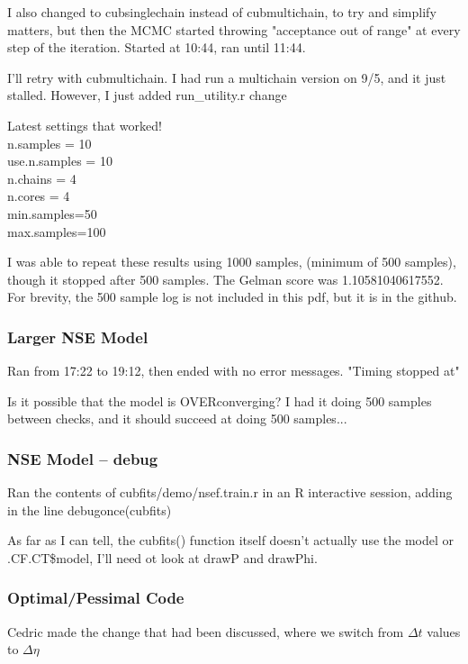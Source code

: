 \documentclass[11pt]{article} %
\begin{document}
I also changed to cubsinglechain instead of cubmultichain, to try and simplify matters, but then the MCMC started throwing "acceptance out of range" at every step of the iteration. Started at 10:44, ran until 11:44. 

I'll retry with cubmultichain. I had run a multichain version on 9/5, and it just stalled. However, I just added run\_utility.r change

Latest settings that worked!
\\n.samples = 10  
\\use.n.samples = 10
\\n.chains = 4
\\n.cores = 4
\\min.samples=50
\\max.samples=100




I was able to repeat these results using 1000 samples, (minimum of 500 samples), though it stopped after 500 samples. The Gelman score was 1.10581040617552. For brevity, the 500 sample log is not included in this pdf, but it is in the github.


\subsubsection{Larger NSE Model}

Ran from 17:22 to 19:12, then ended with no error messages. "Timing stopped at"

Is it possible that the model is OVERconverging? I had it doing 500 samples between checks, and it should succeed at doing 500 samples...


\subsubsection{NSE Model -- debug}

Ran the contents of cubfits/demo/nsef.train.r in an R interactive session, adding in the line debugonce(cubfits)

As far as I can tell, the cubfits() function itself doesn't actually use the model or .CF.CT\$model, I'll need ot look at drawP and drawPhi.


\subsubsection{Optimal/Pessimal Code}

Cedric made the change that had been discussed, where we switch from $\Delta t$ values to $\Delta\eta$
\end{document}
